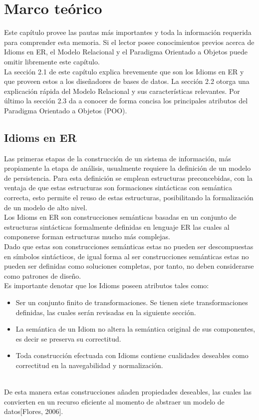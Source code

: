 
\chapter{Marco teórico}
\noindent Este capítulo provee las pautas más importantes y toda la información requerida para
\noindent comprender esta memoria. Si el lector posee conocimientos previos acerca de Idioms en ER,
\noindent el Modelo Relacional y el Paradigma Orientado a Objetos puede omitir libremente este
\noindent capítulo. \\
\indent  La sección 2.1 de este capítulo explica brevemente que son los Idioms en ER y que
\noident proveen estos a los diseñadores de bases de datos. La sección 2.2 otorga una explicación
\noident rápida del Modelo Relacional y sus características relevantes. Por último la sección 2.3
\noident da a conocer de forma concisa los principales atributos del Paradigma Orientado a Objetos (POO).
\section {Idioms en ER}
\noident Las primeras etapas de la construcción de un sistema de información, más propiamente
\noident la etapa de análisis, usualmente requiere la definición de un modelo de persistencia.
\noident Para esta definición se emplean estructuras preconcebidas, con la ventaja de que estas estructuras
\noident son formaciones sintácticas con semántica correcta, esto permite el reuso de estas estructuras, posibilitando
\noident la formalización de un modelo de alto nivel. \\
\indent  Los Idioms en ER son construcciones semánticas basadas en un conjunto de estructuras sintácticas formalmente
\noident definidas en lenguaje ER las cuales al componerse forman estructuras mucho más complejas.\\
\noident Dado que estas son construcciones semánticas estas no pueden ser descompuestas en símbolos sintácticos,
\noident de igual forma al ser construcciones semánticas estas no pueden ser definidas como soluciones completas,
\noident por tanto, no deben considerarse como patrones de diseño.\\
\noident Es importante denotar que los Idioms poseen atributos tales como:
\begin{itemize}
    \item Ser un conjunto finito de transformaciones. Se tienen siete transformaciones definidas, las cuales serán revisadas en la siguiente sección.
    \item La semántica de un Idiom no altera la semántica original de sus componentes, es decir se preserva su correctitud.
    \item Toda construcción efectuada con Idioms contiene cualidades deseables como correctitud en la navegabilidad y normalización.
\end{itemize} \\
\noident De esta manera estas construcciones añaden propiedades deseables, las cuales las convierten en un recurso eficiente al
\noident momento de abstraer un modelo de datos[Flores, 2006].
